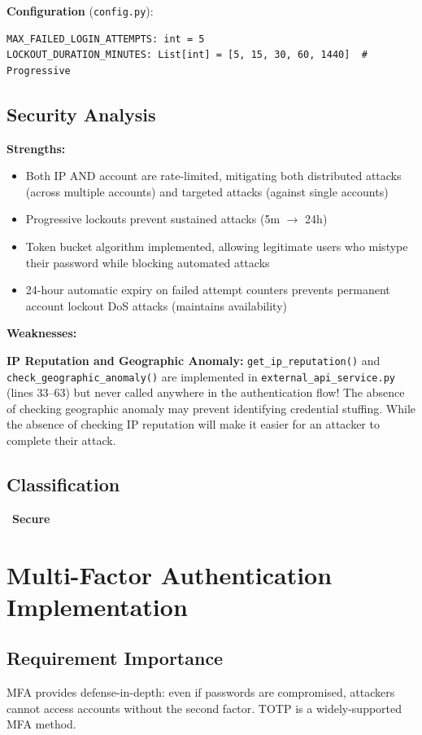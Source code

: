 \documentclass[11pt,a4paper]{article}
\newcommand{\secure}{\textcolor{securegreen}{\checkmark~\textbf{Secure}}}
\begin{document}
\textbf{Configuration} (\texttt{config.py}):
\begin{lstlisting}
MAX_FAILED_LOGIN_ATTEMPTS: int = 5
LOCKOUT_DURATION_MINUTES: List[int] = [5, 15, 30, 60, 1440]  # Progressive
\end{lstlisting}

\subsection{Security Analysis}

\textbf{Strengths:}
\begin{itemize}[noitemsep]
    \item Both IP AND account are rate-limited, mitigating both distributed attacks (across multiple accounts) and targeted attacks (against single accounts)
    \item Progressive lockouts prevent sustained attacks (5m $\rightarrow$ 24h)
    \item Token bucket algorithm implemented, allowing legitimate users who mistype their password while blocking automated attacks
    \item 24-hour automatic expiry on failed attempt counters prevents permanent account lockout DoS attacks (maintains availability)
\end{itemize}

\textbf{Weaknesses:}

\textbf{IP Reputation and Geographic Anomaly:} \texttt{get\_ip\_reputation()} and \texttt{check\_geographic\_anomaly()} are implemented in \texttt{external\_api\_service.py} (lines 33--63) but never called anywhere in the authentication flow! The absence of checking geographic anomaly may prevent identifying credential stuffing. While the absence of checking IP reputation will make it easier for an attacker to complete their attack.

\subsection{Classification}
\secure

\newpage
\section{Multi-Factor Authentication Implementation}

\subsection{Requirement Importance}
MFA provides defense-in-depth: even if passwords are compromised, attackers cannot access accounts without the second factor. TOTP is a widely-supported MFA method.
\end{document}
